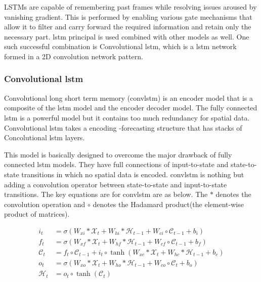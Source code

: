 \documentclass[a4paper,12pt]{report}
\begin{document}
\begin{itemize}
LSTMs are capable of remembering past frames while resolving issues aroused by vanishing gradient. This is performed by enabling various gate mechanisms that allow it to filter and carry forward the required information and retain only the necessary part. \gls{lstm} principal is used combined with other models as well. One such successful combination is Convolutional \gls{lstm}, which is a \gls{lstm} network formed in a 2D convolution network pattern.   
\subsubsection{Convolutional \gls{lstm}}

Convolutional long short term memory (\gls{convlstm}) is an encoder model that is a composite of the \gls{lstm} model and the encoder decoder model. The fully connected \gls{lstm} is a powerful model but it contains too much redundancy for spatial data. Convolutional \gls{lstm} takes a encoding -forecasting structure that has stacks of Concolutional \gls{lstm} layers. 

This model is basically designed to overcome the major drawback of fully connected \gls{lstm} models. They have full connections of input-to-state and state-to-state transitions in which no spatial data is encoded. \gls{convlstm} is nothing but adding a convolution operator between state-to-state and input-to-state transitions. 
The key equations are for \gls{convlstm} are as below. The $*$ denotes the convolution operation and $\circ$ denotes the Hadamard product(the element-wise product of matrices).

\begin{equation}
    \begin{aligned} i _ { t } & = \sigma \left( W _ { x i } * \mathcal { X } _ { t } + W _ { h i } * \mathcal { H } _ { t - 1 } + W _ { c i } \circ \mathcal { C } _ { t - 1 } + b _ { i } \right) \\ f _ { t } & = \sigma \left( W _ { x f } * \mathcal { X } _ { t } + W _ { h f } * \mathcal { H } _ { t - 1 } + W _ { c f } \circ \mathcal { C } _ { t - 1 } + b _ { f } \right) \\ \mathcal { C } _ { t } & = f _ { t } \circ \mathcal { C } _ { t - 1 } + i _ { t } \circ \tanh \left( W _ { x c } * \mathcal { X } _ { t } + W _ { h c } * \mathcal { H } _ { t - 1 } + b _ { c } \right) \\ o _ { t } & = \sigma \left( W _ { x o } * \mathcal { X } _ { t } + W _ { h o } * \mathcal { H } _ { t - 1 } + W _ { c o } \circ \mathcal { C } _ { t } + b _ { o } \right) \\ \mathcal { H } _ { t } & = o _ { t } \circ \tanh \left( \mathcal { C } _ { t } \right) \end{aligned}
\end{equation}


\end{itemize}
\end{document}
